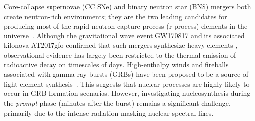\documentclass[linenumbers,twocolumn]{aastex631}
\begin{document}
Core-collapse supernovae (CC SNe) and binary neutron star (BNS) mergers both create neutron-rich environments; they are the two leading candidates for producing most of the rapid neutron-capture process (r-process) elements in the universe~\citep[e.g.][]{1974ApJ...192L.145L, 1989Natur.340..126E,2007PhR...450...97A,2004A&A...416..997A,2014MNRAS.438.2177M,2015MNRAS.452.1970W, 2018ApJ...869..130R,2019LRR....23....1M,2020ApJ...903L...3W,2024Natur.626..737L}. Although the gravitational wave event GW170817 and its associated kilonova AT2017gfo confirmed that such mergers synthesize heavy elements \citep{2017PhRvL.119p1101A, 2019LRR....23....1M}, observational evidence has largely been restricted to the thermal emission of radioactive decay on timescales of days. High-enthalpy winds and fireballs associated with gamma-ray bursts (GRBs) have been proposed to be a source of light-element synthesis~\citep[e.g.][]{1967ARA&A...5..525F,2001ApJ...561..957P,2000ApJ...533..424O,2001ApJ...562..887T,2002ApJ...580..368P}. This suggests that nuclear processes are highly likely to occur in GRB formation scenarios.  %
However, investigating nucleosynthesis during the \textit{prompt} phase (minutes after the burst) remains a significant challenge, primarily due to the intense radiation masking nuclear spectral lines.


\end{document}
